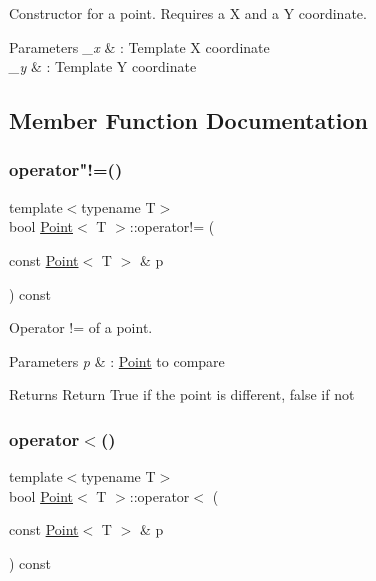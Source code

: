 Constructor for a point. Requires a X and a Y coordinate. 


\begin{DoxyParams}{Parameters}
{\em \+\_\+x} & \+: Template X coordinate \\
\hline
{\em \+\_\+y} & \+: Template Y coordinate \\
\hline
\end{DoxyParams}


\subsection{Member Function Documentation}
\mbox{\label{classPoint_ac0b85ea22cdadeed30c4a8db0cfc76f9}} 
\subsubsection{\texorpdfstring{operator"!=()}{operator!=()}}
{\footnotesize\ttfamily template$<$typename T$>$ \\
bool \hyperlink{classPoint}{Point}$<$ T $>$\+::operator!= (\begin{DoxyParamCaption}\item[{const \hyperlink{classPoint}{Point}$<$ T $>$ \&}]{p }\end{DoxyParamCaption}) const\hspace{0.3cm}{\ttfamily [inline]}}



Operator != of a point. 


\begin{DoxyParams}{Parameters}
{\em p} & \+: \hyperlink{classPoint}{Point} to compare \\
\hline
\end{DoxyParams}
\begin{DoxyReturn}{Returns}
Return True if the point is different, false if not 
\end{DoxyReturn}
\mbox{\label{classPoint_a4871508a56f646b8e95cd11257ea093e}} 
\subsubsection{\texorpdfstring{operator$<$()}{operator<()}}
{\footnotesize\ttfamily template$<$typename T$>$ \\
bool \hyperlink{classPoint}{Point}$<$ T $>$\+::operator$<$ (\begin{DoxyParamCaption}\item[{const \hyperlink{classPoint}{Point}$<$ T $>$ \&}]{p }\end{DoxyParamCaption}) const\hspace{0.3cm}{\ttfamily [inline]}}




